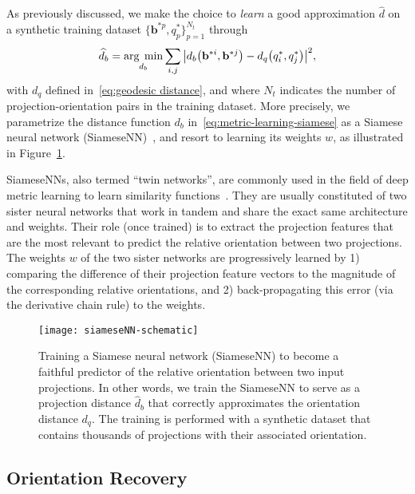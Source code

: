 As previously discussed, we make the choice to \textit{learn} a good approximation $\widehat{d}$ on a synthetic training dataset $\big\{ \mathbf{b}^{*p}, q^*_p\big\}_{p=1}^{N_t}$ through
\begin{equation}
    \label{eq:metric-learning-siamese}
    \widehat{d}_b=\underset{d_b}{\arg\;\min}\sum_{i,j} \big|d_b\big(\mathbf{b}^{*i},\mathbf{b}^{*j}\big) - d_q\big(q^*_i,q^*_j\big) \big|^2,
\end{equation}
with $d_q$ defined in~\eqref{eq:geodesic distance}, and where $N_t$ indicates the number of projection-orientation pairs in the training dataset. More precisely, we parametrize the distance function $d_b$ in~\eqref{eq:metric-learning-siamese} as a Siamese neural network (SiameseNN)~\cite{chopra2005learning}, and resort to learning its weights $w$, as illustrated in Figure~\ref{fig:siamese-schematic}.

SiameseNNs, also termed ``twin networks'', are commonly used in the field of deep metric learning to learn similarity functions~\cite{yi2014deep}. They are usually constituted of two sister neural networks that work in tandem and share the exact same architecture and weights.  Their role (once trained) is to extract the projection features that are the most relevant to predict the relative orientation between two projections. The weights $w$ of the two sister networks are progressively learned by 1) comparing the difference of their projection feature vectors to the magnitude of the corresponding relative orientations, and 2) back-propagating this error (via the derivative chain rule) to the weights.

\begin{figure}
    \centering
    \texttt{[image: siameseNN-schematic]}
    \caption{Training a Siamese neural network (SiameseNN) to become a faithful predictor of the relative orientation between two input projections. In other words, we train the SiameseNN to serve as a projection distance $\widehat{d}_b$ that correctly approximates the orientation distance $d_q$. The training is performed with a synthetic dataset that contains thousands of projections with their associated orientation.}
    \label{fig:siamese-schematic}
\end{figure}

\subsection{Orientation Recovery}
\label{sec:orientation-recovery}

